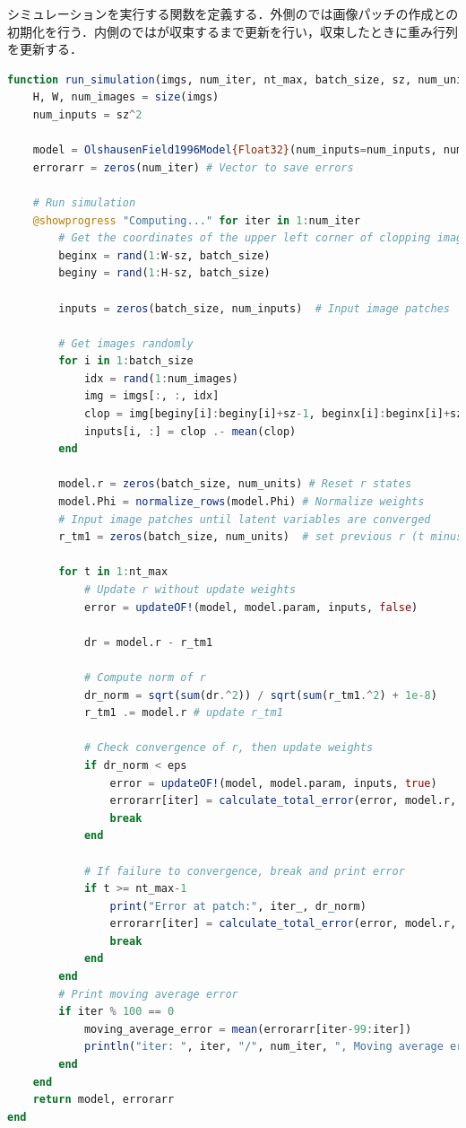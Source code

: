 シミュレーションを実行する関数を定義する．外側のでは画像パッチの作成との初期化を行う．内側のではが収束するまで更新を行い，収束したときに重み行列を更新する．
\begin{lstlisting}[language=julia]
function run_simulation(imgs, num_iter, nt_max, batch_size, sz, num_units, eps)
    H, W, num_images = size(imgs)
    num_inputs = sz^2

    model = OlshausenField1996Model{Float32}(num_inputs=num_inputs, num_units=num_units, batch_size=batch_size)
    errorarr = zeros(num_iter) # Vector to save errors    
    
    # Run simulation
    @showprogress "Computing..." for iter in 1:num_iter
        # Get the coordinates of the upper left corner of clopping image randomly.
        beginx = rand(1:W-sz, batch_size)
        beginy = rand(1:H-sz, batch_size)

        inputs = zeros(batch_size, num_inputs)  # Input image patches

        # Get images randomly
        for i in 1:batch_size        
            idx = rand(1:num_images)
            img = imgs[:, :, idx]
            clop = img[beginy[i]:beginy[i]+sz-1, beginx[i]:beginx[i]+sz-1][:]
            inputs[i, :] = clop .- mean(clop)
        end

        model.r = zeros(batch_size, num_units) # Reset r states
        model.Phi = normalize_rows(model.Phi) # Normalize weights
        # Input image patches until latent variables are converged 
        r_tm1 = zeros(batch_size, num_units)  # set previous r (t minus 1)

        for t in 1:nt_max
            # Update r without update weights 
            error = updateOF!(model, model.param, inputs, false)

            dr = model.r - r_tm1 

            # Compute norm of r
            dr_norm = sqrt(sum(dr.^2)) / sqrt(sum(r_tm1.^2) + 1e-8)
            r_tm1 .= model.r # update r_tm1

            # Check convergence of r, then update weights
            if dr_norm < eps
                error = updateOF!(model, model.param, inputs, true)
                errorarr[iter] = calculate_total_error(error, model.r, model.param.λ) # Append errors
                break
            end

            # If failure to convergence, break and print error
            if t >= nt_max-1
                print("Error at patch:", iter_, dr_norm)
                errorarr[iter] = calculate_total_error(error, model.r, model.param.λ) # Append errors
                break
            end
        end
        # Print moving average error
        if iter % 100 == 0
            moving_average_error = mean(errorarr[iter-99:iter])
            println("iter: ", iter, "/", num_iter, ", Moving average error:", moving_average_error)
        end
    end
    return model, errorarr
end
\end{lstlisting}
